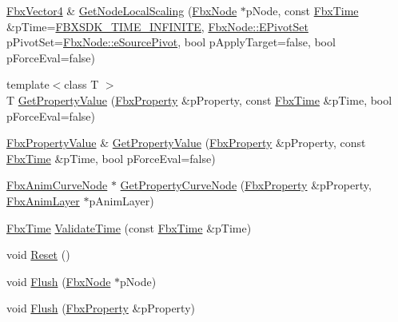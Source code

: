 \begin{DoxyCompactItemize}
\item 
\hyperlink{class_fbx_vector4}{Fbx\+Vector4} \& \hyperlink{class_fbx_anim_evaluator_aba31ec4baa8452ad2fcfdc82c85cc127}{Get\+Node\+Local\+Scaling} (\hyperlink{class_fbx_node}{Fbx\+Node} $\ast$p\+Node, const \hyperlink{class_fbx_time}{Fbx\+Time} \&p\+Time=\hyperlink{fbxtime_8h_a1e6db3fe0f84f0b7daa775739f93526f}{F\+B\+X\+S\+D\+K\+\_\+\+T\+I\+M\+E\+\_\+\+I\+N\+F\+I\+N\+I\+TE}, \hyperlink{class_fbx_node_ae62b7311ac4727654cdf1ebd5cbf7343}{Fbx\+Node\+::\+E\+Pivot\+Set} p\+Pivot\+Set=\hyperlink{class_fbx_node_ae62b7311ac4727654cdf1ebd5cbf7343ae8ed37a5c7e41f8d1cec9d3fa8424b69}{Fbx\+Node\+::e\+Source\+Pivot}, bool p\+Apply\+Target=false, bool p\+Force\+Eval=false)
\item 
{\footnotesize template$<$class T $>$ }\\T \hyperlink{class_fbx_anim_evaluator_a49b4a647d33b2ce26b27ba35ddb8a0ed}{Get\+Property\+Value} (\hyperlink{class_fbx_property}{Fbx\+Property} \&p\+Property, const \hyperlink{class_fbx_time}{Fbx\+Time} \&p\+Time, bool p\+Force\+Eval=false)
\item 
\hyperlink{class_fbx_property_value}{Fbx\+Property\+Value} \& \hyperlink{class_fbx_anim_evaluator_a98b68793cbb2d95f499ea2d433dd8c4d}{Get\+Property\+Value} (\hyperlink{class_fbx_property}{Fbx\+Property} \&p\+Property, const \hyperlink{class_fbx_time}{Fbx\+Time} \&p\+Time, bool p\+Force\+Eval=false)
\item 
\hyperlink{class_fbx_anim_curve_node}{Fbx\+Anim\+Curve\+Node} $\ast$ \hyperlink{class_fbx_anim_evaluator_a63f726da981ecfea4fc4f60145bb0f1d}{Get\+Property\+Curve\+Node} (\hyperlink{class_fbx_property}{Fbx\+Property} \&p\+Property, \hyperlink{class_fbx_anim_layer}{Fbx\+Anim\+Layer} $\ast$p\+Anim\+Layer)
\item 
\hyperlink{class_fbx_time}{Fbx\+Time} \hyperlink{class_fbx_anim_evaluator_af5226e1b2bc178417980b746c34888e4}{Validate\+Time} (const \hyperlink{class_fbx_time}{Fbx\+Time} \&p\+Time)
\item 
void \hyperlink{class_fbx_anim_evaluator_a95c636f04474f350c3a1eda55ded8b29}{Reset} ()
\item 
void \hyperlink{class_fbx_anim_evaluator_a17b08c51a766be597aac881807913ea8}{Flush} (\hyperlink{class_fbx_node}{Fbx\+Node} $\ast$p\+Node)
\item 
void \hyperlink{class_fbx_anim_evaluator_a2f738a737153248cc988aca609c4bf84}{Flush} (\hyperlink{class_fbx_property}{Fbx\+Property} \&p\+Property)
\item 

\end{DoxyCompactItemize}
